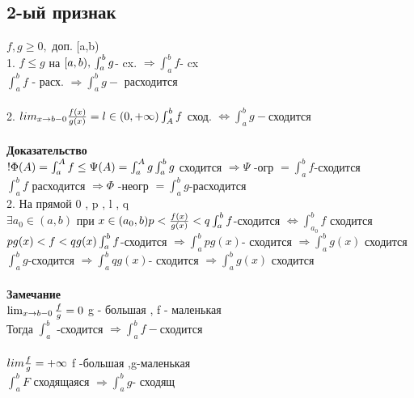 \documentclass[12pt, a4paper]{article}
\begin{document}
	\subsection{2-ый признак}
	$  f, g \geq 0 ,$ доп. [a,b) \\
	1. $f \leq g$ на $ [a,b),\\
	\int_a^b g $- cx. $ \Rightarrow \int_a^b f $- cx \\ 
	$\int_a^b f$ - расх. $ \Rightarrow \int_a^b g -$ расходится  \\
	\\
	2. $lim_{x \rightarrow b - 0} \frac{f(x)}{g(x)} = l \in (0 , +\infty) \\
	\int_A^b f$ сход. $ \Leftrightarrow \int_a^b g - $сходится \\
	\\
	\textbf{Доказательство}\\
	$ ! \Phi(A) = \int_a^A f \leq \Psi(A) = \int_a^A g \\
	\int_a^b g $ сходится $ \Rightarrow \Psi $ -огр $ = \int_a^b f $-сходится \\
	$\int_a^b f $ расходится $ \Rightarrow \Phi $ -неогр $ = \int_a^b g $-расходится \\
	2. На прямой 0 , p , l , q \\
	$ \exists  a_0 \in (a,b) $ при $  x \in (a_0,b) p < \frac{f(x)}{g(x)} < q \\
	\int_a^b f $-сходится $ \Leftrightarrow \int_{a_0}^b f $ сходится \\
	$ p g(x) < f < q g(x) \\
	\int_a^b f $-сходится  $ \Rightarrow \int_a^b p g(x) $- сходится $ \Rightarrow \int _a^b g(x) $ сходится \\
	$  \int_a^b g$-сходится  $ \Rightarrow \int_a^b q g(x) $- сходится $ \Rightarrow \int _a^b g(x) $ сходится \\
	\\
	\textbf{Замечание}\\
	$ \lim_{x \rightarrow b - 0} \frac{f}{g} = 0 \\$
	g - большая ,  f - маленькая \\
	Тогда $ \int_a^b$ -сходится $ \Rightarrow \int_a^b f- $сходится \\
	\\
	$lim \frac{f}{g} = +\infty \\$
	f -большая ,g-маленькая \\
	$ \int_a^b F $  сходящаяся $ \Rightarrow \int_a^b g $- сходящ\\   
	
\end{document}
